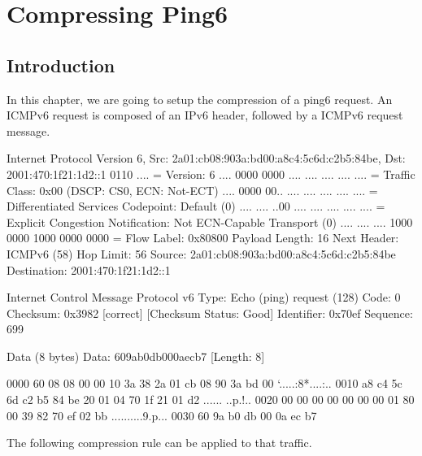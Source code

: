 
\chapter{Compressing Ping6}

\section{Introduction}

In this chapter, we are going to setup the compression of a ping6 request. An ICMPv6 request is composed of an IPv6 header, followed by a ICMPv6 request message.

\begin{termc}[backgroundcolor=\color{gray!10}, basicstyle=\ttfamily\tiny, escapechar=@]
Internet Protocol Version 6, Src: 2a01:cb08:903a:bd00:a8c4:5c6d:c2b5:84be, Dst: 
2001:470:1f21:1d2::1
    0110 .... = Version: 6
    .... 0000 0000 .... .... .... .... .... = Traffic Class: 0x00 (DSCP: CS0, ECN: Not-ECT)
        .... 0000 00.. .... .... .... .... .... = Differentiated Services Codepoint: Default (0)
        .... .... ..00 .... .... .... .... .... = Explicit Congestion Notification: Not ECN-Capable Transport (0)
    .... .... .... 1000 0000 1000 0000 0000 = Flow Label: 0x80800
    Payload Length: 16
    Next Header: ICMPv6 (58)
    Hop Limit: 56
    Source: 2a01:cb08:903a:bd00:a8c4:5c6d:c2b5:84be
    Destination: 2001:470:1f21:1d2::1
    
Internet Control Message Protocol v6
    Type: Echo (ping) request (128)
    Code: 0
    Checksum: 0x3982 [correct]
    [Checksum Status: Good]
    Identifier: 0x70ef
    Sequence: 699

    Data (8 bytes)
        Data: 609ab0db000aecb7
        [Length: 8]

0000  60 08 08 00 00 10 3a 38 2a 01 cb 08 90 3a bd 00   `.....:8*....:..
0010  a8 c4 5c 6d c2 b5 84 be 20 01 04 70 1f 21 01 d2   ..\m.... ..p.!..
0020  00 00 00 00 00 00 00 01 80 00 39 82 70 ef 02 bb   ..........9.p...
0030  60 9a b0 db 00 0a ec b7  
\end{termc}

The following compression rule can be applied to that traffic.

